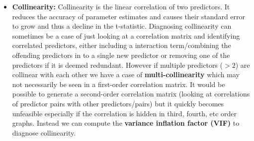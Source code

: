 \begin{itemize}
    \item \textbf{Collinearity:} Collinearity is the linear correlation of two predictors. It reduces the accuracy of parameter estimates and causes their standard error to grow and thus a decline in the t-statistic. Diagnosing collinearity can sometimes be a case of just looking at a correlation matrix and identifying correlated predictors, either including a interaction term/combining the offending predictors in to a single new predictor or removing one of the predictors if it is deemed redundant. However if multiple predictors ($>2$) are collinear with each other we have a case of \textbf{multi-collinearity} which may not necessarily be seen in a first-order correlation matrix. It would be possible to generate a second-order correlation matrix (looking at correlations of predictor pairs with other predictors/pairs) but it quickly becomes unfeasible especially if the correlation is hidden in third, fourth, etc order graphs. Instead we can compute the \textbf{variance inflation factor (VIF)} to diagnose collinearity.
\end{itemize}
